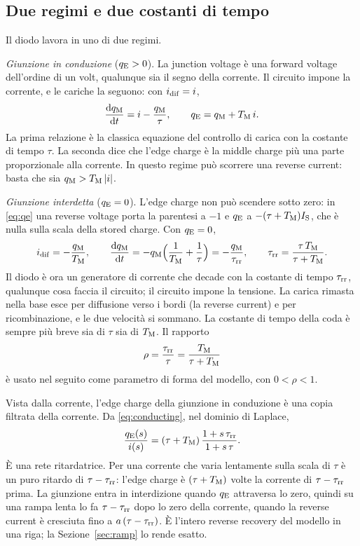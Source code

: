 \documentclass[10pt,a4paper]{scrartcl}
\let\newcommand\lmitdefine
\newcommand{\taurr}{\tau_\mathrm{rr}}
\newcommand{\TM}{T_\mathrm{M}}
\newcommand{\qE}{q_\mathrm{E}}
\newcommand{\qM}{q_\mathrm{M}}
\newcommand{\idif}{i_\mathrm{dif}}
\newcommand{\IS}{I_\mathrm{S}}
\newcommand{\diff}{\mathrm{d}}
\begin{document}
\subsection{Due regimi e due costanti di tempo}
\label{sec:regimes}
Il diodo lavora in uno di due regimi.

\emph{Giunzione in conduzione} ($\qE > 0$). La junction voltage è una forward voltage dell'ordine di un volt, qualunque sia il segno della corrente. Il circuito impone la corrente, e le cariche la seguono: con $\idif = i$,
\begin{equation}
\frac{\diff \qM}{\diff t} = i - \frac{\qM}{\tau} , \qquad \qE = \qM + \TM\, i .
\label{eq:conducting}
\end{equation}
La prima relazione è la classica equazione del controllo di carica con la costante di tempo $\tau$. La seconda dice che l'edge charge è la middle charge più una parte proporzionale alla corrente. In questo regime può scorrere una reverse current: basta che sia $\qM > \TM\,|i|$.

\emph{Giunzione interdetta} ($\qE = 0$). L'edge charge non può scendere sotto zero: in \eqref{eq:qe} una reverse voltage porta la parentesi a $-1$ e $\qE$ a $-(\tau+\TM)\IS$, che è nulla sulla scala della stored charge. Con $\qE = 0$,
\begin{equation}
\idif = -\frac{\qM}{\TM} , \qquad \frac{\diff\qM}{\diff t} = -\qM\Bigl(\frac1\TM + \frac1\tau\Bigr) = -\frac{\qM}{\taurr} , \qquad \taurr = \frac{\tau\,\TM}{\tau+\TM} .
\label{eq:blocked}
\end{equation}
Il diodo è ora un generatore di corrente che decade con la costante di tempo $\taurr$, qualunque cosa faccia il circuito; il circuito impone la tensione. La carica rimasta nella base esce per diffusione verso i bordi (la reverse current) e per ricombinazione, e le due velocità si sommano. La costante di tempo della coda è sempre più breve sia di $\tau$ sia di $\TM$. Il rapporto
\begin{equation}
\rho = \frac{\taurr}{\tau} = \frac{\TM}{\tau+\TM}
\label{eq:rho}
\end{equation}
è usato nel seguito come parametro di forma del modello, con $0 < \rho < 1$.

Vista dalla corrente, l'edge charge della giunzione in conduzione è una copia filtrata della corrente. Da \eqref{eq:conducting}, nel dominio di Laplace,
\begin{equation}
\frac{\qE(s)}{i(s)} = (\tau+\TM)\,\frac{1+s\,\taurr}{1+s\,\tau} .
\label{eq:filter}
\end{equation}
È una rete ritardatrice. Per una corrente che varia lentamente sulla scala di $\tau$ è un puro ritardo di $\tau-\taurr$: l'edge charge è $(\tau+\TM)$ volte la corrente di $\tau-\taurr$ prima. La giunzione entra in interdizione quando $\qE$ attraversa lo zero, quindi su una rampa lenta lo fa $\tau-\taurr$ dopo lo zero della corrente, quando la reverse current è cresciuta fino a $a\,(\tau-\taurr)$. È l'intero reverse recovery del modello in una riga; la Sezione~\ref{sec:ramp} lo rende esatto.
\end{document}
